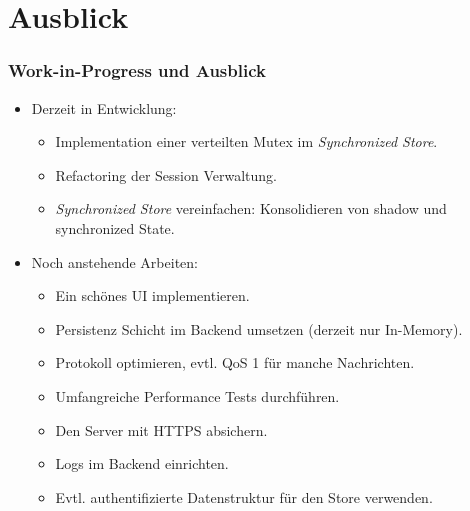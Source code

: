 \section{Ausblick}
\begin{frame}
    \frametitle{Work-in-Progress und Ausblick}
    \begin{itemize}
        \item Derzeit in Entwicklung:
        \begin{itemize}
            \item Implementation einer verteilten Mutex im \textit{Synchronized Store}.
            \item Refactoring der Session Verwaltung.
            \item \textit{Synchronized Store} vereinfachen: Konsolidieren von shadow und synchronized State.
        \end{itemize}
        \item Noch anstehende Arbeiten:
        \begin{itemize}
            \item Ein schönes UI implementieren.
            \item Persistenz Schicht im Backend umsetzen (derzeit nur In-Memory).
            \item Protokoll optimieren, evtl. QoS 1 für manche Nachrichten.
            \item Umfangreiche Performance Tests durchführen.
            \item Den Server mit HTTPS absichern.
            \item Logs im Backend einrichten.
            \item Evtl. authentifizierte Datenstruktur für den Store verwenden.
        \end{itemize}
    \end{itemize}
\end{frame}